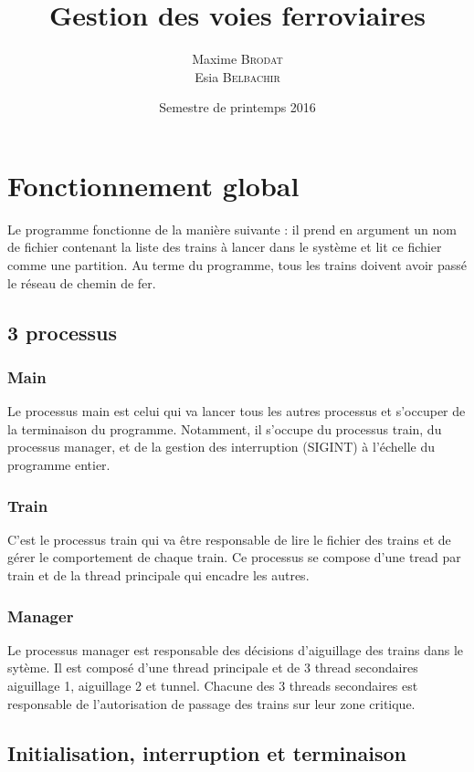 \documentclass[a4paper,12pt]{article}
\title{Gestion des voies ferroviaires}{Projet de LO41}
\author{Maxime \textsc{Brodat} \\ Esia \textsc{Belbachir}}
\date{Semestre de printemps 2016}
\begin{document}
\maketitlepage

\tableofcontents
\pagebreak


\section{Fonctionnement global}

Le programme fonctionne de la manière suivante : il prend en argument un nom de fichier contenant la liste des trains à lancer dans le système et lit ce fichier comme une partition. Au terme du programme, tous les trains doivent avoir passé le réseau de chemin de fer.

\subsection{3 processus}

\subsubsection{Main}

Le processus main est celui qui va lancer tous les autres processus et s'occuper de la terminaison du programme. Notamment, il s'occupe du processus train, du processus manager, et de la gestion des interruption (SIGINT) à l'échelle du programme entier.

\subsubsection{Train}

C'est le processus train qui va être responsable de lire le fichier des trains et de gérer le comportement de chaque train. Ce processus se compose d'une tread par train et de la thread principale qui encadre les autres.

\subsubsection{Manager}

Le processus manager est responsable des décisions d'aiguillage des trains dans le sytème. Il est composé d'une thread principale et de 3 thread secondaires aiguillage 1, aiguillage 2 et tunnel. Chacune des 3 threads secondaires est responsable de l'autorisation de passage des trains sur leur zone critique.

\subsection{Initialisation, interruption et terminaison}
\end{document}
